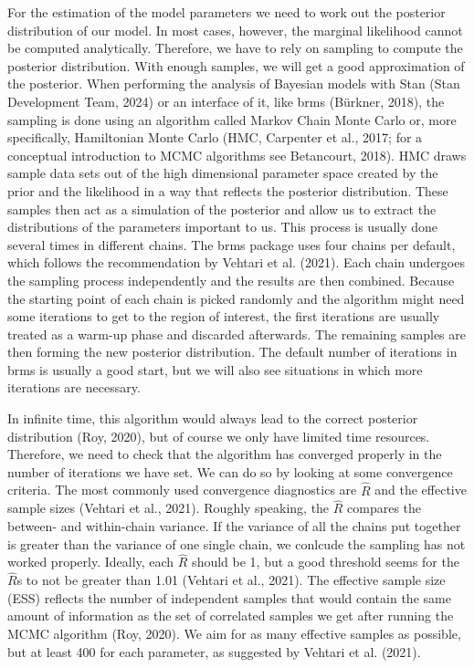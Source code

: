 \documentclass[
  doc,12pt,floatsintext]{apa7}
\begin{document}
For the estimation of the model parameters we need to work out the posterior distribution of our model. In most cases, however, the marginal likelihood cannot be computed analytically. Therefore, we have to rely on sampling to compute the posterior distribution. With enough samples, we will get a good approximation of the posterior. When performing the analysis of Bayesian models with Stan (Stan Development Team, 2024) or an interface of it, like brms (Bürkner, 2018), the sampling is done using an algorithm called Markov Chain Monte Carlo or, more specifically, Hamiltonian Monte Carlo (HMC, Carpenter et al., 2017; for a conceptual introduction to MCMC algorithms see Betancourt, 2018). HMC draws sample data sets out of the high dimensional parameter space created by the prior and the likelihood in a way that reflects the posterior distribution. These samples then act as a simulation of the posterior and allow us to extract the distributions of the parameters important to us. This process is usually done several times in different chains. The brms package uses four chains per default, which follows the recommendation by Vehtari et al. (2021). Each chain undergoes the sampling process independently and the results are then combined. Because the starting point of each chain is picked randomly and the algorithm might need some iterations to get to the region of interest, the first iterations are usually treated as a warm-up phase and discarded afterwards. The remaining samples are then forming the new posterior distribution. The default number of iterations in brms is usually a good start, but we will also see situations in which more iterations are necessary.

In infinite time, this algorithm would always lead to the correct posterior distribution (Roy, 2020), but of course we only have limited time resources. Therefore, we need to check that the algorithm has converged properly in the number of iterations we have set. We can do so by looking at some convergence criteria. The most commonly used convergence diagnostics are \(\hat{R}\) and the effective sample sizes (Vehtari et al., 2021). Roughly speaking, the \(\hat{R}\) compares the between- and within-chain variance. If the variance of all the chains put together is greater than the variance of one single chain, we conlcude the sampling has not worked properly. Ideally, each \(\hat{R}\) should be 1, but a good threshold seems for the \(\hat{R}\)s to not be greater than 1.01 (Vehtari et al., 2021). The effective sample size (ESS) reflects the number of independent samples that would contain the same amount of information as the set of correlated samples we get after running the MCMC algorithm (Roy, 2020). We aim for as many effective samples as possible, but at least 400 for each parameter, as suggested by Vehtari et al. (2021).
\end{document}
